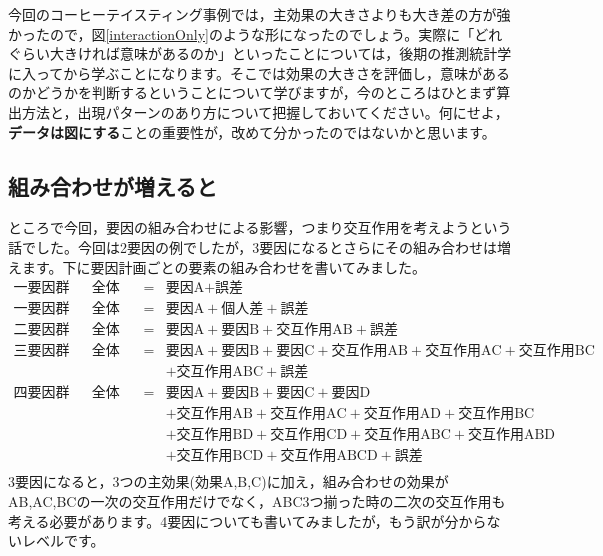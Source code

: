 \documentclass{ltjbook}
\begin{document}
今回のコーヒーテイスティング事例では，主効果の大きさよりも大き差の方が強かったので，図\ref{interactionOnly}のような形になったのでしょう。実際に「どれぐらい大きければ意味があるのか」といったことについては，後期の推測統計学に入ってから学ぶことになります。そこでは効果の大きさを評価し，意味があるのかどうかを判断するということについて学びますが，今のところはひとまず算出方法と，出現パターンのあり方について把握しておいてください。何にせよ，\textbf{データは図にする}ことの重要性が，改めて分かったのではないかと思います。


\subsection{組み合わせが増えると}
ところで今回，要因の組み合わせによる影響，つまり交互作用を考えようという話でした。今回は2要因の例でしたが，3要因になるとさらにその組み合わせは増えます。下に要因計画ごとの要素の組み合わせを書いてみました。
\[
	\begin{array}{llll}
		\mbox{一要因群間計画} & \mbox{全体変動} & = & \mbox{要因A} + \mbox{誤差}                                                                        \\
		\mbox{一要因群内計画} & \mbox{全体変動} & = & \mbox{要因A} + \mbox{個人差} + \mbox{誤差}                                                        \\
		\mbox{二要因群間計画} & \mbox{全体変動} & = & \mbox{要因A} + \mbox{要因B} +\mbox{交互作用AB} +\mbox{誤差}                                       \\
		\mbox{三要因群間計画} & \mbox{全体変動} & = & \mbox{要因A} + \mbox{要因B} + \mbox{要因C}+\mbox{交互作用AB} +\mbox{交互作用AC}+\mbox{交互作用BC} \\
		                      &                 &   & +\mbox{交互作用ABC}  +\mbox{誤差}                                                                 \\
		\mbox{四要因群間計画} & \mbox{全体変動} & = & \mbox{要因A} + \mbox{要因B} + \mbox{要因C} + \mbox{要因D}                                         \\
		                      &                 &   & + \mbox{交互作用AB} +\mbox{交互作用AC} +\mbox{交互作用AD}+\mbox{交互作用BC}                       \\
		                      &                 &   & +\mbox{交互作用BD} +\mbox{交互作用CD}+\mbox{交互作用ABC}+\mbox{交互作用ABD}                       \\
		                      &                 &   & +\mbox{交互作用BCD} +\mbox{交互作用ABCD} +\mbox{誤差}                                             \\
	\end{array}
\]
3要因になると，3つの主効果(効果A,B,C)に加え，組み合わせの効果がAB,AC,BCの一次の交互作用だけでなく，ABC3つ揃った時の二次の交互作用も考える必要があります。4要因についても書いてみましたが，もう訳が分からないレベルです。
\end{document}
